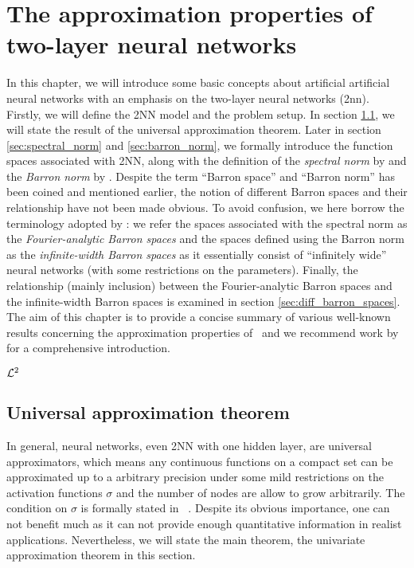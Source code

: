 \chapter{The approximation properties of two-layer neural networks}

In this chapter, we will introduce some basic concepts about artificial
artificial neural networks with an emphasis on the two-layer neural networks
(\gls{2nn}). Firstly, we will define the 2NN model and the problem setup. In
section \ref{sec:uat}, we will state the result of the universal approximation
theorem. Later in section \ref{sec:spectral_norm} and \ref{sec:barron_norm}, we
formally introduce the function spaces associated with 2NN, along with the
definition of the \textit{spectral norm} by
\cite{barronUniversalApproximationBounds1993} and the \textit{Barron norm} by
\cite{eBarronSpaceFlowinduced2021}. Despite the term ``Barron space'' and
``Barron norm'' has been coined and mentioned earlier, the notion of different
Barron spaces and their relationship have not been made obvious. To avoid
confusion, we here borrow the terminology adopted by
\cite{carageaNeuralNetworkApproximation2022}: we refer the spaces associated
with the spectral norm as the \textit{Fourier-analytic Barron spaces} and the
spaces defined using the Barron norm as the \textit{infinite-width Barron
spaces} as it essentially consist of ``infinitely wide'' neural networks (with
some restrictions on the parameters). Finally, the relationship (mainly
inclusion) between the Fourier-analytic Barron spaces and the infinite-width
Barron spaces is examined in section \ref{sec:diff_barron_spaces}. The aim of
this chapter is to provide a concise summary of various well-known results
concerning the approximation properties of \ and we recommend work by
\cite{eMathematicalUnderstandingNeural2020,bernerModernMathematicsDeep2021} for
a comprehensive introduction.

$\mathcal{L}^{2}$






\section{Universal approximation theorem}
\label{sec:uat}

In general, neural networks, even 2NN with one hidden layer, are universal
approximators, which means any continuous functions on a compact set can be
approximated up to a arbitrary precision under some mild restrictions on the
activation functions $\sigma$ and the number of nodes are allow to grow
arbitrarily. The condition on $\sigma$ is formally stated in
~\cite{cybenkoApproximationSuperpositionsSigmoidal1989}. Despite its obvious
importance, one can not benefit much as it can not provide enough quantitative
information in realist applications. Nevertheless, we will state the main theorem, the univariate approximation theorem in this section.

